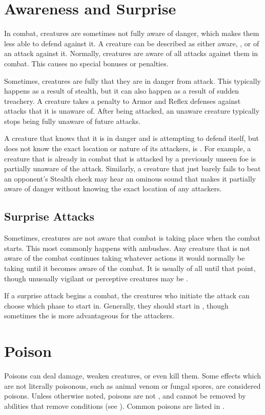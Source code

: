 \section{Awareness and Surprise}\label{Awareness and Surprise}
    In combat, creatures are sometimes not fully aware of danger, which makes them less able to defend against it.
    A creature can be described as either aware, \unaware, or \partiallyunaware of an attack against it.
    Normally, creatures are aware of all attacks against them in combat.
    This causes no special bonuses or penalties.

    Sometimes, creatures are fully \unaware that they are in danger from attack.
    This typically happens as a result of stealth, but it can also happen as a result of sudden treachery.
    A creature takes a  penalty to Armor and Reflex defenses against attacks that it is unaware of.
    After being attacked, an unaware creature typically stops being fully unaware of future attacks.

    A creature that knows that it is in danger and is attempting to defend itself, but does not know the exact location or nature of its attackers, is \partiallyunaware.
    For example, a creature that is already in combat that is attacked by a previously unseen foe is partially unaware of the attack.
    Similarly, a creature that just barely fails to beat an opponent's Stealth check may hear an ominous sound that makes it partially aware of danger without knowing the exact location of any attackers.

    \subsection{Surprise Attacks}\label{Surprise Attacks}
        Sometimes, creatures are not aware that combat is taking place when the combat starts.
        This most commonly happens with ambushes.
        Any creature that is not aware of the combat continues taking whatever actions it would normally be taking until it becomes aware of the combat.
        It is usually \unaware of all until that point, though unusually vigilant or perceptive creatures may be \partiallyunaware.

        If a surprise attack begins a combat, the creatures who initiate the attack can choose which phase to start in.
        Generally, they should start in , though sometimes the  is more advantageous for the attackers.

\section{Poison}\label{Poison}
    Poisons can deal damage, weaken creatures, or even kill them.
    Some effects which are not literally poisonous, such as animal venom or fungal spores, are considered poisons.
    Unless otherwise noted, poisons are not , and cannot be removed by abilities that remove conditions (see ).
    Common poisons are listed in .

